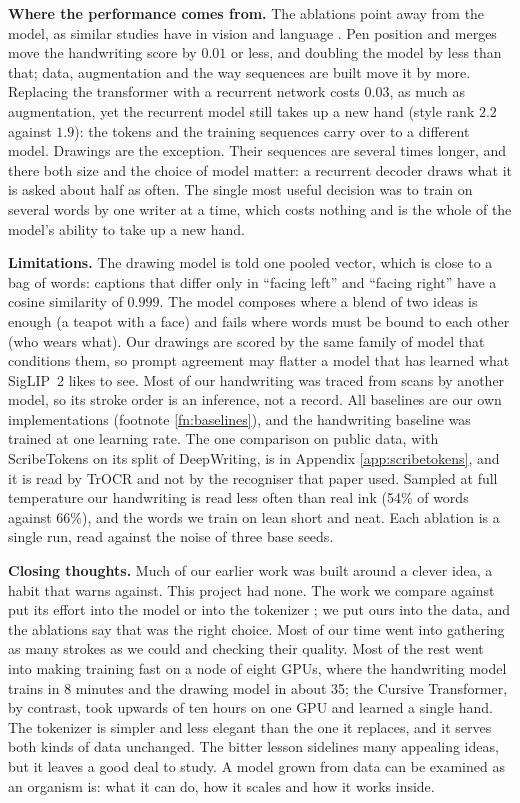 \documentclass{article}
\begin{document}
\textbf{Where the performance comes from.} The ablations point away from the model, as similar studies have in vision and language \citep{sutton2019bitter,wightman2021resnet,steiner2022how}. Pen position and merges move the handwriting score by $0.01$ or less, and doubling the model by less than that; data, augmentation and the way sequences are built move it by more. Replacing the transformer with a recurrent network costs $0.03$, as much as augmentation, yet the recurrent model still takes up a new hand (style rank $2.2$ against $1.9$): the tokens and the training sequences carry over to a different model. Drawings are the exception. Their sequences are several times longer, and there both size and the choice of model matter: a recurrent decoder draws what it is asked about half as often. The single most useful decision was to train on several words by one writer at a time, which costs nothing and is the whole of the model's ability to take up a new hand.

\textbf{Limitations.} The drawing model is told one pooled vector, which is close to a bag of words: captions that differ only in ``facing left'' and ``facing right'' have a cosine similarity of $0.999$. The model composes where a blend of two ideas is enough (a teapot with a face) and fails where words must be bound to each other (who wears what). Our drawings are scored by the same family of model that conditions them, so prompt agreement may flatter a model that has learned what SigLIP~2 likes to see. Most of our handwriting was traced from scans by another model, so its stroke order is an inference, not a record. All baselines are our own implementations (footnote \ref{fn:baselines}), and the handwriting baseline was trained at one learning rate. The one comparison on public data, with ScribeTokens on its split of DeepWriting, is in Appendix \ref{app:scribetokens}, and it is read by TrOCR and not by the recogniser that paper used. Sampled at full temperature our handwriting is read less often than real ink (54\% of words against 66\%), and the words we train on lean short and neat. Each ablation is a single run, read against the noise of three base seeds.

\textbf{Closing thoughts.} Much of our earlier work was built around a clever idea, a habit that \citet{sutton2019bitter} warns against. This project had none. The work we compare against put its effort into the model \citep{graves2014generating,ha2018neural} or into the tokenizer \citep{greydanus2025cursive,wang2026scribetokens}; we put ours into the data, and the ablations say that was the right choice. Most of our time went into gathering as many strokes as we could and checking their quality. Most of the rest went into making training fast on a node of eight GPUs, where the handwriting model trains in 8 minutes and the drawing model in about 35; the Cursive Transformer, by contrast, took upwards of ten hours on one GPU and learned a single hand. The tokenizer is simpler and less elegant than the one it replaces, and it serves both kinds of data unchanged. The bitter lesson sidelines many appealing ideas, but it leaves a good deal to study. A model grown from data can be examined as an organism is: what it can do, how it scales and how it works inside.
\end{document}
